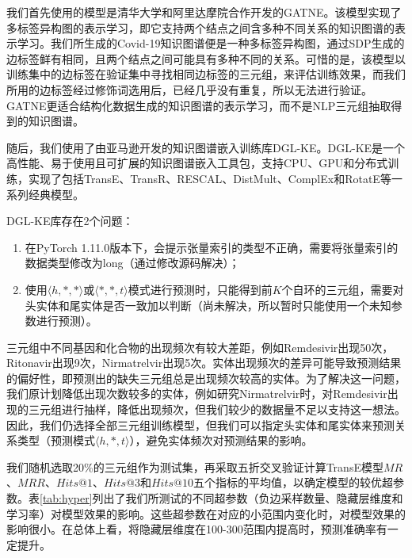 \documentclass[twocolumn]{article}
\begin{document}
我们首先使用的模型是清华大学和阿里达摩院合作开发的GATNE\cite{GATNE}。该模型实现了多标签异构图的表示学习，即它支持两个结点之间含多种不同关系的知识图谱的表示学习。我们所生成的Covid-19知识图谱便是一种多标签异构图，通过SDP生成的边标签鲜有相同，且两个结点之间可能具有多种不同的关系。可惜的是，该模型以训练集中的边标签在验证集中寻找相同边标签的三元组，来评估训练效果，而我们所用的边标签经过修饰词选用后，已经几乎没有重复，所以无法进行验证。GATNE更适合结构化数据生成的知识图谱的表示学习，而不是NLP三元组抽取得到的知识图谱。\par
随后，我们使用了由亚马逊开发的知识图谱嵌入训练库DGL-KE\cite{DGL-KE}。DGL-KE是一个高性能、易于使用且可扩展的知识图谱嵌入工具包，支持CPU、GPU和分布式训练，实现了包括TransE、TransR、RESCAL、DistMult、ComplEx和RotatE等一系列经典模型。\par
DGL-KE库存在2个问题：\par
\begin{enumerate}
	\item 在PyTorch 1.11.0版本下，会提示张量索引的类型不正确，需要将张量索引的数据类型修改为long（通过修改源码解决）；
	\item 使用$\langle h, *, *\rangle$或$\langle *, *, t\rangle$模式进行预测时，只能得到前$K$个自环的三元组，需要对头实体和尾实体是否一致加以判断（尚未解决，所以暂时只能使用一个未知参数进行预测）。
\end{enumerate}\par
三元组中不同基因和化合物的出现频次有较大差距，例如Remdesivir出现50次，Ritonavir出现9次，Nirmatrelvir出现5次。实体出现频次的差异可能导致预测结果的偏好性，即预测出的缺失三元组总是出现频次较高的实体。为了解决这一问题，我们原计划降低出现次数较多的实体，例如研究Nirmatrelvir时，对Remdesivir出现的三元组进行抽样，降低出现频次，但我们较少的数据量不足以支持这一想法。因此，我们仍选择全部三元组训练模型，但我们可以指定头实体和尾实体来预测关系类型（预测模式$\langle h, *, t\rangle$），避免实体频次对预测结果的影响。\par
我们随机选取20\%的三元组作为测试集，再采取五折交叉验证计算TransE模型$MR$、$MRR$、$Hits@1$、$Hits@3$和$Hits@10$五个指标的平均值，以确定模型的较优超参数。表\ref{tab:hyper}列出了我们所测试的不同超参数（负边采样数量、隐藏层维度和学习率）对模型效果的影响。这些超参数在对应的小范围内变化时，对模型效果的影响很小。在总体上看，将隐藏层维度在100-300范围内提高时，预测准确率有一定提升。\par
\end{document}
